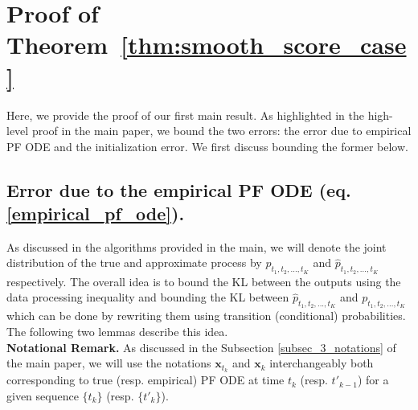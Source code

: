 \documentclass[11pt]{article}
\def\rvx{{\mathbf{x}}}
\begin{document}
\section{Proof of Theorem~\ref{thm:smooth_score_case}}

\label{appendix:proof_of_thm1}
\noindent



\noindent
Here, we provide the proof of our first main result. As highlighted in the high-level proof in the main paper, we bound the two errors: the error due to empirical PF ODE
and the initialization error. We first discuss bounding the former below.

\subsection{Error due to the empirical PF ODE (eq. \ref{empirical_pf_ode}).} 
\label{err_1}
As discussed in the algorithms provided in the main, we will denote the joint distribution of the true and approximate process by $p_{t_1, t_2, ..., t_{K}}$ and $\hat{p}_{t_1, t_2, ..., t_{K}}$ respectively. The overall idea is to bound the KL between the outputs using the data processing inequality and bounding the KL between $\hat{p}_{t_1, t_2, ..., t_{K}}$ and $p_{t_1, t_2, ..., t_{K}}$ which can be done by rewriting them using transition (conditional) probabilities. The following two lemmas describe this idea. \\

\noindent
\textbf{Notational Remark.} As discussed in the Subsection \ref{subsec_3_notations} of the main paper, we will use the notations $\rvx_{t_k}$ and $\rvx_{k}$ interchangeably both corresponding to true (resp. empirical) PF ODE at time $t_k$ (resp. $t'_{k-1}$) for a given sequence $\{t_k\}$ (resp. $\{t'_k\}$).

\vspace{0.2in}
\end{document}
